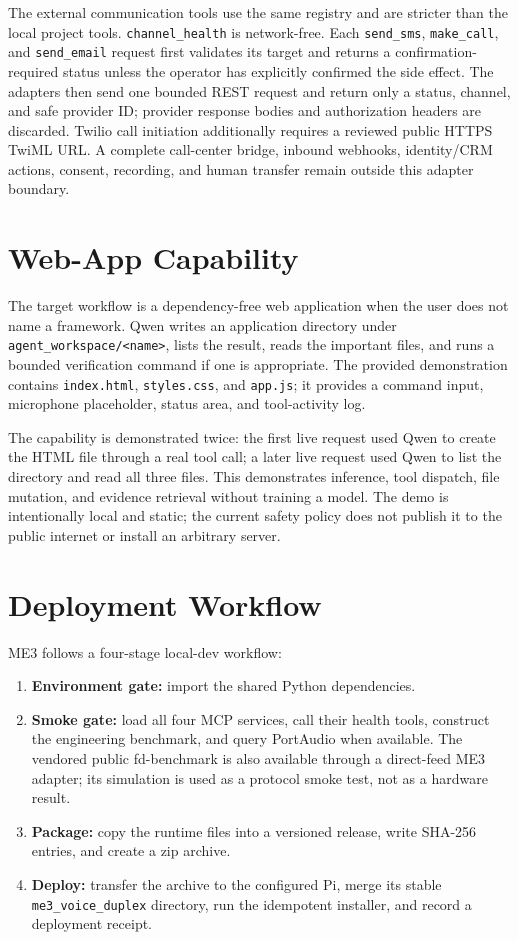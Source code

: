 \documentclass[sigconf,nonacm]{acmart}
\begin{document}
The external communication tools use the same registry and are stricter than
the local project tools. \texttt{channel\_health} is network-free. Each
\texttt{send\_sms}, \texttt{make\_call}, and \texttt{send\_email} request first
validates its target and returns a confirmation-required status unless the
operator has explicitly confirmed the side effect. The adapters then send one
bounded REST request and return only a status, channel, and safe provider ID;
provider response bodies and authorization headers are discarded. Twilio call
initiation additionally requires a reviewed public HTTPS TwiML URL. A complete
call-center bridge, inbound webhooks, identity/CRM actions, consent, recording,
and human transfer remain outside this adapter boundary.

\section{Web-App Capability}

The target workflow is a dependency-free web application when the user does not
name a framework. Qwen writes an application directory under
\texttt{agent\_workspace/<name>}, lists the result, reads the important files,
and runs a bounded verification command if one is appropriate. The provided
demonstration contains \texttt{index.html}, \texttt{styles.css}, and
\texttt{app.js}; it provides a command input, microphone placeholder, status
area, and tool-activity log.

The capability is demonstrated twice: the first live request used Qwen to
create the HTML file through a real tool call; a later live request used Qwen
to list the directory and read all three files. This demonstrates inference,
tool dispatch, file mutation, and evidence retrieval without training a model.
The demo is intentionally local and static; the current safety policy does not
publish it to the public internet or install an arbitrary server.

\section{Deployment Workflow}

ME3 follows a four-stage local-dev workflow:
\begin{enumerate}[leftmargin=*]
\item \textbf{Environment gate:} import the shared Python dependencies.
\item \textbf{Smoke gate:} load all four MCP services, call their health tools,
construct the engineering benchmark, and query PortAudio when available.
The vendored public fd-benchmark is also available through a direct-feed ME3
adapter; its simulation is used as a protocol smoke test, not as a hardware
result.
\item \textbf{Package:} copy the runtime files into a versioned release, write
SHA-256 entries, and create a zip archive.
\item \textbf{Deploy:} transfer the archive to the configured Pi, merge its
stable \texttt{me3\_voice\_duplex} directory, run the idempotent installer,
and record a deployment receipt.
\end{enumerate}
\end{document}
